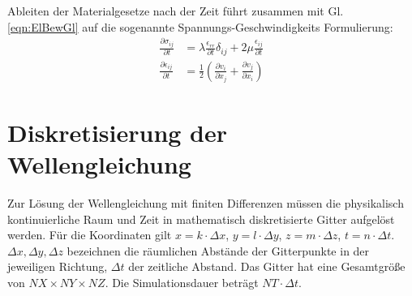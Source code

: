 \documentclass[pdftex,a4paper,parskip,listof=totoc,bibliography=totoc,onehalfspacing,12pt]{scrreprt}
\begin{document}
Ableiten der Materialgesetze nach der Zeit führt zusammen mit Gl. \ref{eqn:ElBewGl} auf die sogenannte Spannungs-Geschwindigkeits Formulierung:
\begin{align}
	\frac{\partial\sigma_{ij}}{\partial t} &= \lambda \frac{\epsilon_{rr}}{\partial t} \delta_{ij} + 2 \mu \frac{\epsilon_{ij}}{\partial t}\label{eqn:GenHookdt}\\
	\frac{\partial\epsilon_{ij}}{\partial t} &= \frac{1}{2} \left( \frac{\partial v_i}{\partial x_j} + \frac{\partial v_j}{\partial x_i} \right)\label{eqn:Dehnijdt}
\end{align}

\cleardoublepage
\chapter{Diskretisierung der Wellengleichung}
Zur Lösung der Wellengleichung mit finiten Differenzen müssen die physikalisch kontinuierliche Raum und Zeit in mathematisch diskretisierte Gitter aufgelöst werden. Für die Koordinaten gilt $x=k \cdot \Delta x$, $y=l \cdot \Delta y$, $z=m \cdot \Delta z$, $t=n \cdot \Delta t$. $\Delta x, \Delta y, \Delta z$ bezeichnen die räumlichen Abstände der Gitterpunkte in der jeweiligen Richtung, $\Delta t$ der zeitliche Abstand. Das Gitter hat eine Gesamtgröße von $NX \times NY \times NZ$. Die Simulationsdauer beträgt $NT \cdot \Delta t$.
\end{document}
